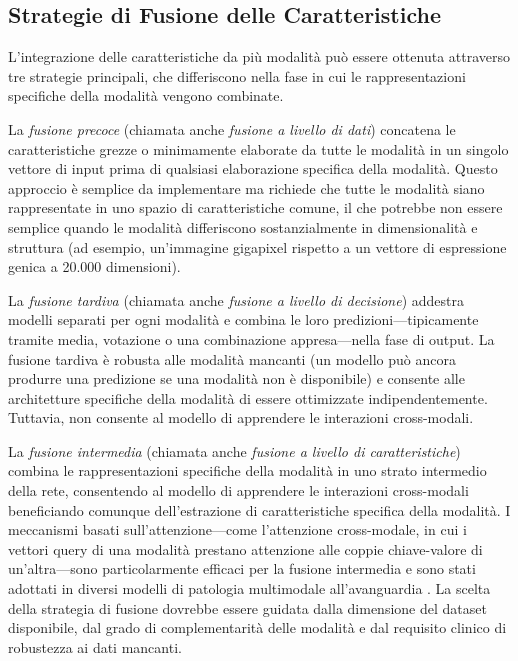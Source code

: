 \subsection{Strategie di Fusione delle Caratteristiche}

L'integrazione delle caratteristiche da più modalità può essere ottenuta attraverso tre strategie principali, che differiscono nella fase in cui le rappresentazioni specifiche della modalità vengono combinate.

La \emph{fusione precoce} (chiamata anche \emph{fusione a livello di dati}) concatena le caratteristiche grezze o minimamente elaborate da tutte le modalità in un singolo vettore di input prima di qualsiasi elaborazione specifica della modalità. Questo approccio è semplice da implementare ma richiede che tutte le modalità siano rappresentate in uno spazio di caratteristiche comune, il che potrebbe non essere semplice quando le modalità differiscono sostanzialmente in dimensionalità e struttura (ad esempio, un'immagine gigapixel rispetto a un vettore di espressione genica a 20.000 dimensioni).

La \emph{fusione tardiva} (chiamata anche \emph{fusione a livello di decisione}) addestra modelli separati per ogni modalità e combina le loro predizioni---tipicamente tramite media, votazione o una combinazione appresa---nella fase di output. La fusione tardiva è robusta alle modalità mancanti (un modello può ancora produrre una predizione se una modalità non è disponibile) e consente alle architetture specifiche della modalità di essere ottimizzate indipendentemente. Tuttavia, non consente al modello di apprendere le interazioni cross-modali.

La \emph{fusione intermedia} (chiamata anche \emph{fusione a livello di caratteristiche}) combina le rappresentazioni specifiche della modalità in uno strato intermedio della rete, consentendo al modello di apprendere le interazioni cross-modali beneficiando comunque dell'estrazione di caratteristiche specifica della modalità. I meccanismi basati sull'attenzione---come l'attenzione cross-modale, in cui i vettori query di una modalità prestano attenzione alle coppie chiave-valore di un'altra---sono particolarmente efficaci per la fusione intermedia e sono stati adottati in diversi modelli di patologia multimodale all'avanguardia \cite{song2023,xu2024}. La scelta della strategia di fusione dovrebbe essere guidata dalla dimensione del dataset disponibile, dal grado di complementarità delle modalità e dal requisito clinico di robustezza ai dati mancanti.


